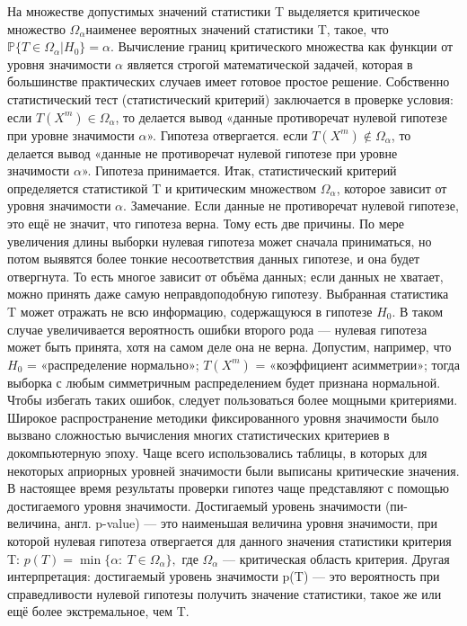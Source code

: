 \documentclass[a4paper, 12pt]{article}
\begin{document}
	На множестве допустимых значений статистики T выделяется критическое множество $\Omega_\alpha $наименее вероятных значений статистики T, такое, что $\mathbb{P}\{T\in\Omega_\alpha\left|H_0\right.\} = \alpha$. Вычисление границ критического множества как функции от уровня значимости $\alpha$ является строгой математической задачей, которая в большинстве практических случаев имеет готовое простое решение.
	Собственно статистический тест (статистический критерий) заключается в проверке условия:
	если $T(X^m)\in\Omega_\alpha$, то делается вывод «данные противоречат нулевой гипотезе при уровне значимости $\alpha$». Гипотеза отвергается.
	если $T(X^m)\notin\Omega_\alpha$, то делается вывод «данные не противоречат нулевой гипотезе при уровне значимости $\alpha$». Гипотеза принимается.
	Итак, статистический критерий определяется статистикой T и критическим множеством $\Omega_\alpha$, которое зависит от уровня значимости $\alpha$.
	Замечание. Если данные не противоречат нулевой гипотезе, это ещё не значит, что гипотеза верна. Тому есть две причины.
	По мере увеличения длины выборки нулевая гипотеза может сначала приниматься, но потом выявятся более тонкие несоответствия данных гипотезе, и она будет отвергнута. То есть многое зависит от объёма данных; если данных не хватает, можно принять даже самую неправдоподобную гипотезу.
	Выбранная статистика T может отражать не всю информацию, содержащуюся в гипотезе $H_0$. В таком случае увеличивается вероятность ошибки второго рода — нулевая гипотеза может быть принята, хотя на самом деле она не верна. Допустим, например, что $H_0$ = «распределение нормально»; $T(X^m)$ = «коэффициент асимметрии»; тогда выборка с любым симметричным распределением будет признана нормальной. Чтобы избегать таких ошибок, следует пользоваться более мощными критериями.
	Широкое распространение методики фиксированного уровня значимости было вызвано сложностью вычисления многих статистических критериев в докомпьютерную эпоху. Чаще всего использовались таблицы, в которых для некоторых априорных уровней значимости были выписаны критические значения. В настоящее время результаты проверки гипотез чаще представляют с помощью достигаемого уровня значимости.
	Достигаемый уровень значимости (пи-величина, англ. p-value) — это наименьшая величина уровня значимости, при которой нулевая гипотеза отвергается для данного значения статистики критерия T:
	$p(T) = \min \{ \alpha:\: T\in\Omega_\alpha \},$
	где  $\Omega_\alpha$ — критическая область критерия.
	Другая интерпретация: достигаемый уровень значимости p(T) — это вероятность при справедливости нулевой гипотезы получить значение статистики, такое же или ещё более экстремальное, чем T.
\end{document}
